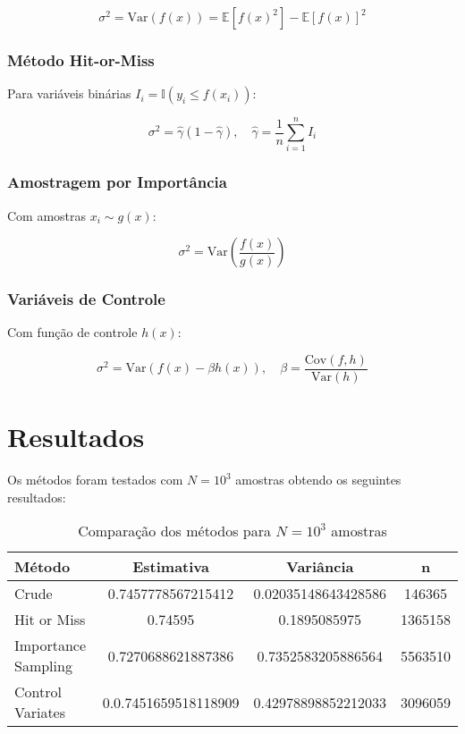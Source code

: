 \documentclass[12pt, a4paper]{article}
\begin{document}
\begin{equation}
\sigma^2 = \text{Var}(f(x)) = \mathbb{E}[f(x)^2] - \mathbb{E}[f(x)]^2
\end{equation}

\subsubsection{Método Hit-or-Miss}
Para variáveis binárias $I_i = \mathbb{I}(y_i \leq f(x_i))$:

\begin{equation}
\sigma^2 = \hat{\gamma}(1 - \hat{\gamma}), \quad \hat{\gamma} = \frac{1}{n}\sum_{i=1}^n I_i
\end{equation}

\subsubsection{Amostragem por Importância}
Com amostras $x_i \sim g(x)$:

\begin{equation}
\sigma^2 = \text{Var}\left(\frac{f(x)}{g(x)}\right)
\end{equation}

\subsubsection{Variáveis de Controle}
Com função de controle $h(x)$:

\begin{equation}
\sigma^2 = \text{Var}\left(f(x) - \beta h(x)\right), \quad \beta = \frac{\text{Cov}(f,h)}{\text{Var}(h)}
\end{equation}

\section{Resultados}
\label{sec:resultados}

Os métodos foram testados com \( N = 10^3 \) amostras obtendo os seguintes resultados:

\begin{table}[h]
\centering
\caption{Comparação dos métodos para \(N = 10^3\) amostras}
\begin{tabular}{|l|c|c|c|}
\hline
Método & Estimativa & Variância  & n\\ \hline
Crude &  0.7457778567215412 & 0.02035148643428586 & 146365\\ \hline
Hit or Miss & 0.74595 & 0.1895085975 & 1365158 \\ \hline
Importance Sampling & 0.7270688621887386 & 0.7352583205886564 & 5563510\\ \hline
Control Variates & 0.0.7451659518118909 & 0.42978898852212033 & 3096059\\ \hline
\end{tabular}
\end{table}
\end{document}
